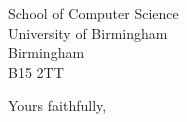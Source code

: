 \documentclass[12pt]{letter}
\begin{document}
\begin{letter}{School of Computer Science \\ University of Birmingham \\ Birmingham \\ B15 2TT}



\closing{\vspace{40pt} Yours faithfully,}
\end{letter}
\end{document}
